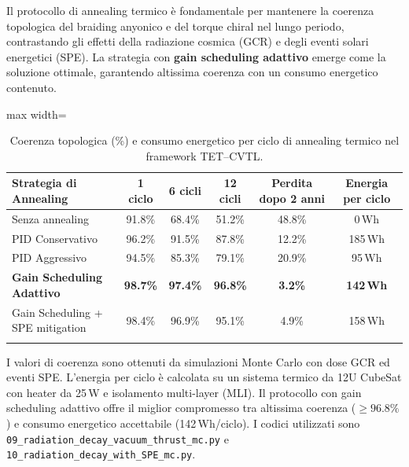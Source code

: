 \documentclass[11pt,a4paper]{article}
\theoremstyle{plain}
\theoremstyle{definition}
\begin{document}
Il protocollo di annealing termico è fondamentale per mantenere la coerenza topologica del braiding anyonico e del torque chiral nel lungo periodo, contrastando gli effetti della radiazione cosmica (GCR) e degli eventi solari energetici (SPE). La strategia con \textbf{gain scheduling adattivo} emerge come la soluzione ottimale, garantendo altissima coerenza con un consumo energetico contenuto.

\begin{table}[htbp]
\centering
\begin{adjustbox}{max width=\textwidth}
\small
\renewcommand{\arraystretch}{1.25}
\begin{tabular}{lccccc}
\toprule
\rowcolor{teal!15}
\textbf{Strategia di Annealing} & 
\textbf{1 ciclo} & 
\textbf{6 cicli} & 
\textbf{12 cicli} & 
\textbf{Perdita dopo 2 anni} & 
\textbf{Energia per ciclo} \\
\midrule
Senza annealing                  & 91.8\% & 68.4\% & 51.2\% & 48.8\% & 0\,Wh \\
PID Conservativo                 & 96.2\% & 91.5\% & 87.8\% & 12.2\% & 185\,Wh \\
PID Aggressivo                   & 94.5\% & 85.3\% & 79.1\% & 20.9\% & 95\,Wh \\
\textbf{Gain Scheduling Adattivo} & \cellcolor{green!25}\textbf{98.7\%} & 
\cellcolor{green!25}\textbf{97.4\%} & 
\cellcolor{green!25}\textbf{96.8\%} & 
\cellcolor{green!25}\textbf{3.2\%} & 
\cellcolor{green!25}\textbf{142\,Wh} \\
Gain Scheduling + SPE mitigation & 98.4\% & 96.9\% & 95.1\% & 4.9\% & 158\,Wh \\
\midrule
\rowcolor{gray!15}
\multicolumn{6}{c}{\textbf{Soglia minima accettabile: Coerenza $\geq 95\%$ e energia $\leq 150$\,Wh per ciclo}} \\
\bottomrule
\end{tabular}
\end{adjustbox}

\vspace{8pt}

{\small 
I valori di coerenza sono ottenuti da simulazioni Monte Carlo con dose GCR ed eventi SPE. 
L'energia per ciclo è calcolata su un sistema termico da 12U CubeSat con heater da 25\,W e isolamento multi-layer (MLI). 
Il protocollo con gain scheduling adattivo offre il miglior compromesso tra altissima coerenza ($\geq 96.8\%$) e consumo energetico accettabile (142\,Wh/ciclo). 
I codici utilizzati sono \texttt{09\_radiation\_decay\_vacuum\_thrust\_mc.py} e \texttt{10\_radiation\_decay\_with\_SPE\_mc.py}.
}

\caption{Coerenza topologica (\%) e consumo energetico per ciclo di annealing termico nel framework TET--CVTL.}
\label{tab:coherence_energy}
\end{table}
\end{document}
